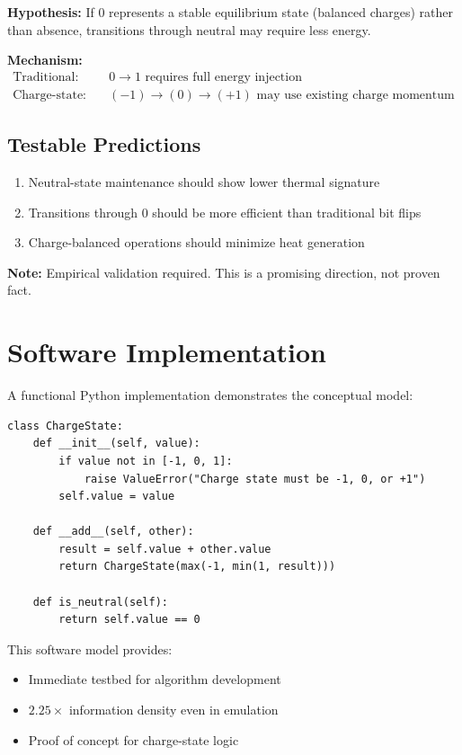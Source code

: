 \documentclass[11pt,a4paper]{article}
\begin{document}
\textbf{Hypothesis:} If $0$ represents a stable equilibrium state (balanced charges) rather than absence, transitions through neutral may require less energy.

\textbf{Mechanism:}
\begin{align*}
\text{Traditional:} &\quad 0\rightarrow 1 \text{ requires full energy injection} \\
\text{Charge-state:} &\quad (-1)\rightarrow (0)\rightarrow (+1) \text{ may use existing charge momentum}
\end{align*}

\subsection{Testable Predictions}

\begin{enumerate}
\item Neutral-state maintenance should show lower thermal signature
\item Transitions through $0$ should be more efficient than traditional bit flips
\item Charge-balanced operations should minimize heat generation
\end{enumerate}

\textbf{Note:} Empirical validation required. This is a promising direction, not proven fact.

\section{Software Implementation}

A functional Python implementation demonstrates the conceptual model:

\begin{verbatim}
class ChargeState:
    def __init__(self, value):
        if value not in [-1, 0, 1]:
            raise ValueError("Charge state must be -1, 0, or +1")
        self.value = value
    
    def __add__(self, other):
        result = self.value + other.value
        return ChargeState(max(-1, min(1, result)))
    
    def is_neutral(self):
        return self.value == 0
\end{verbatim}

This software model provides:
\begin{itemize}
\item Immediate testbed for algorithm development
\item $2.25\times$ information density even in emulation
\item Proof of concept for charge-state logic
\end{itemize}
\end{document}
